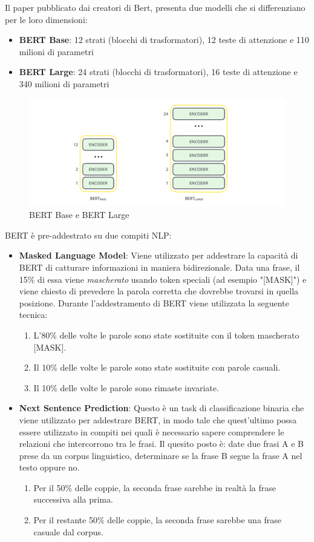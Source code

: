 Il paper pubblicato dai creatori di Bert, presenta due modelli che si differenziano per le loro dimensioni: \begin{itemize}
    \item \textbf{BERT Base}: 12 strati (blocchi di trasformatori), 12 teste di attenzione e 110 milioni di parametri
    \item \textbf{BERT Large}: 24 strati (blocchi di trasformatori), 16 teste di attenzione e 340 milioni di parametri
\end{itemize}
\begin{figure}[hbt!]
    \centering
    \includegraphics[width=1\textwidth]{img/bert_architecture.png}
    \caption{BERT Base e BERT Large}
    \label{fig:bert_architettura}
\end{figure}
\newpage
BERT è pre-addestrato su due compiti NLP:
\begin{itemize}
    \item \textbf{Masked Language Model}: Viene utilizzato per addestrare la capacità di BERT di catturare informazioni in maniera bidirezionale. Data una frase, il 15\% di essa viene \textit{mascherato} usando token speciali (ad esempio "[MASK]") e viene chiesto di prevedere la parola corretta che dovrebbe trovarsi in quella posizione. Durante l'addestramento di BERT viene utilizzata la seguente tecnica:
    \begin{enumerate}
        \item L'80\% delle volte le parole sono state sostituite con il token mascherato [MASK].
        \item Il 10\% delle volte le parole sono state sostituite con parole casuali.
        \item Il 10\% delle volte le parole sono rimaste invariate.
    \end{enumerate}
    \item \textbf{Next Sentence Prediction}: Questo è un task di classificazione binaria che viene utilizzato per addestrare BERT, in modo tale che quest'ultimo possa essere utilizzato in compiti nei quali è necessario sapere comprendere le relazioni che intercorrono tra le frasi. Il quesito posto è: date due frasi A e B prese da un corpus linguistico, determinare se la frase B segue la frase A nel testo oppure no.   
    \begin{enumerate}
        \item Per il 50\% delle coppie, la seconda frase sarebbe in realtà la frase successiva alla prima.
        \item Per il restante 50\% delle coppie, la seconda frase sarebbe una frase casuale dal corpus.
    \end{enumerate}
\end{itemize}